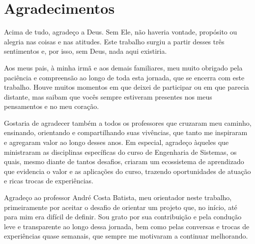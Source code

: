 
\newpage

\chapter*{Agradecimentos} %

Acima de tudo, agradeço a Deus. Sem Ele, não haveria vontade, propósito ou alegria nas coisas e nas atitudes. Este trabalho surgiu a partir desses três sentimentos e, por isso, sem Deus, nada aqui existiria.

Aos meus pais, à minha irmã e aos demais familiares, meu muito obrigado pela paciência e compreensão ao longo de toda esta jornada, que se encerra com este trabalho. Houve muitos momentos em que deixei de participar ou em que parecia distante, mas saibam que vocês sempre estiveram presentes nos meus pensamentos e no meu coração.

Gostaria de agradecer também a todos os professores que cruzaram meu caminho, ensinando, orientando e compartilhando suas vivências, que tanto me inspiraram e agregaram valor ao longo desses anos. Em especial, agradeço àqueles que ministraram as disciplinas específicas do curso de Engenharia de Sistemas, os quais, mesmo diante de tantos desafios, criaram um ecossistema de aprendizado que evidencia o valor e as aplicações do curso, trazendo oportunidades de atuação e ricas trocas de experiências.

Agradeço ao professor André Costa Batista, meu orientador neste trabalho, primeiramente por aceitar o desafio de orientar um projeto que, no início, até para mim era difícil de definir. Sou grato por sua contribuição e pela condução leve e transparente ao longo dessa jornada, bem como pelas conversas e trocas de experiências quase semanais, que sempre me motivaram a continuar melhorando.

\thispagestyle{empty}

